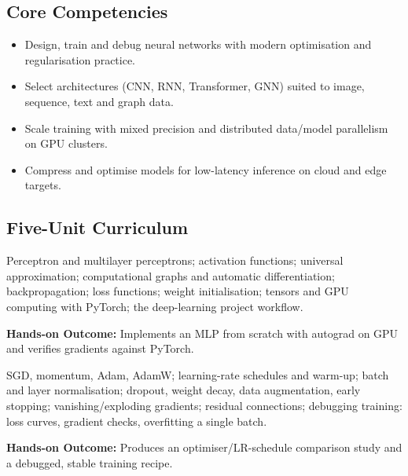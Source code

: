 \documentclass[10pt,a4paper]{article}
\begin{document}
\subsection*{Core Competencies}\begin{itemize}\small
\item Design, train and debug neural networks with modern optimisation and regularisation practice.
\item Select architectures (CNN, RNN, Transformer, GNN) suited to image, sequence, text and graph data.
\item Scale training with mixed precision and distributed data/model parallelism on GPU clusters.
\item Compress and optimise models for low-latency inference on cloud and edge targets.
\end{itemize}
\subsection*{Five-Unit Curriculum}
\begin{tcolorbox}[unitbox,title={{\color{gold}UNIT I}\quad Neural Network Foundations\hfill{\color{gold}9 Hours}}]\small Perceptron and multilayer perceptrons; activation functions; universal approximation; computational graphs and automatic differentiation; backpropagation; loss functions; weight initialisation; tensors and GPU computing with PyTorch; the deep-learning project workflow.\par\vspace{2pt}\par\textbf{Hands-on Outcome:} Implements an MLP from scratch with autograd on GPU and verifies gradients against PyTorch.\end{tcolorbox}
\begin{tcolorbox}[unitbox,title={{\color{gold}UNIT II}\quad Optimisation and Regularisation\hfill{\color{gold}9 Hours}}]\small SGD, momentum, Adam, AdamW; learning-rate schedules and warm-up; batch and layer normalisation; dropout, weight decay, data augmentation, early stopping; vanishing/exploding gradients; residual connections; debugging training: loss curves, gradient checks, overfitting a single batch.\par\vspace{2pt}\par\textbf{Hands-on Outcome:} Produces an optimiser/LR-schedule comparison study and a debugged, stable training recipe.\end{tcolorbox}
\end{document}
